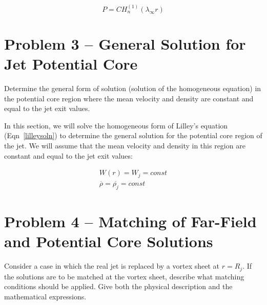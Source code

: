 \documentclass[]{aiaa-tc}%
\begin{document}
\begin{equation} \label{BesselFar}
P = C H_n^{(1)}(\lambda_{\infty} r)
\end{equation}








\section{Problem 3 -- General Solution for Jet Potential Core} %

Determine the general form of solution (solution of the homogeneous equation) in the potential core region where the mean velocity and density are constant and equal to the jet exit values.

In this section, we will solve the homogeneous form of Lilley's equation (Eqn~\ref{lilleysoln}) to determine the general solution for the potential core region of the jet.  We will assume that the mean velocity and density in this region are constant and equal to the jet exit values:

\begin{align}
W(r)=W_j=const \\
\overline{\rho} = \overline{\rho_j} = const
\end{align}


\section{Problem 4 -- Matching of Far-Field and Potential Core Solutions}

Consider a case in which the real jet is replaced by a vortex sheet at $r = R_j$. If the solutions are to be matched at the vortex sheet, describe what matching conditions should be applied. Give both the physical description and the mathematical expressions.
\end{document}
